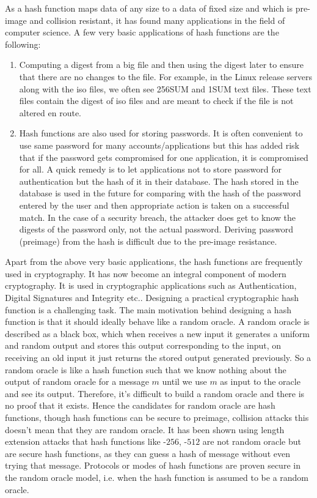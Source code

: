 As a hash function maps data of any size to a data of fixed size and which is pre-image and collision resistant, it has found many applications in the field of computer science. A few very basic applications of hash functions are the following:
\begin{enumerate}
    \item Computing a digest from a big file and then using the digest later to ensure that there are no changes to the file. For example, in the Linux release servers along with the iso files, we often see \SHA256SUM and \SHA1SUM text files. These text files contain the digest of iso files and are meant to check if the file is not altered en route.
    
    \item Hash functions are also used for storing passwords. It 
    is often convenient to use same password for many accounts/applications but this has added risk that if the password gets compromised for one application, it is compromised for all.
    A quick remedy is to let applications  not to store password
   for authentication but the hash of it in their database. The hash stored in the database is used in the future for comparing with the hash of the password entered by the user and then appropriate action is taken on a successful match. In the case of a security breach, the attacker does get to know the digests of the password only, not the actual password. Deriving password (preimage) from the hash is difficult due to the pre-image resistance.
\end{enumerate}

Apart from the above very basic applications, the hash functions are frequently used in cryptography. It has now become an integral component of modern cryptography. It is used in cryptographic applications such as Authentication, Digital Signatures and Integrity etc.. Designing a practical cryptographic hash function is a challenging task. The main motivation behind designing a hash function is that it should ideally behave like a random oracle. A random oracle is described as a black box, which when receives a new input it generates a uniform and random output and stores this output corresponding to the input, on receiving an old input it just returns the stored output generated previously. So a random oracle is like a hash function such that we know nothing about the output of random oracle for a message $m$ until we use $m$ as input to the oracle and see its output. Therefore, it's difficult to build a random oracle and there is no proof that it exists. Hence the candidates for random oracle are hash functions, though hash functions can be secure to preimage, collision attacks this doesn't mean that they are random oracle. It has been shown using length extension attacks that hash functions like \SHA-$256$, \SHA-$512$ are not random oracle but are secure hash functions, as they can guess a hash of message without even trying that message. Protocols or modes of hash functions are proven secure in the random oracle model, i.e. when the hash function is assumed to be a random oracle.

